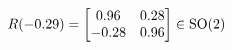 \documentclass[preview]{standalone}
\begin{document}
\begin{align*}
\special{dvisvgm:raw <g id='unique000'>}R(-0.29) = \begin{bmatrix} 0.96 & 0.28 \\ -0.28 & 0.96 \end{bmatrix} \in \text{SO}(2)\special{dvisvgm:raw </g>}
\end{align*}
\end{document}
